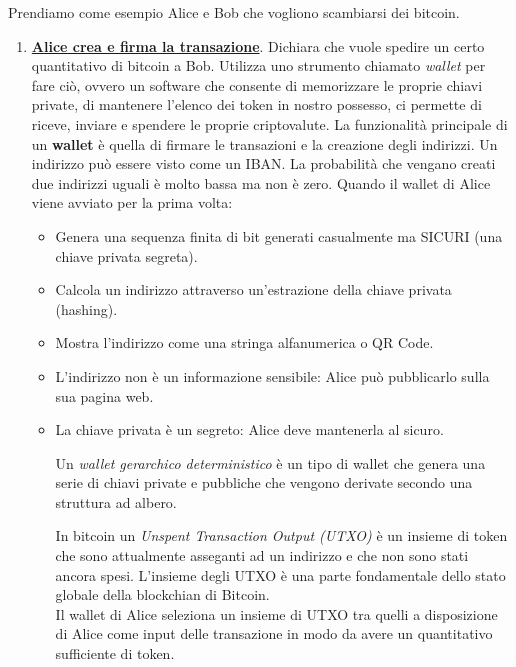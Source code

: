 \documentclass[a4paper]{article}
\begin{document}
Prendiamo come esempio Alice e Bob che vogliono scambiarsi dei bitcoin.
\begin{enumerate}
    \item \underline{\textbf{Alice crea e firma la transazione}}. Dichiara che vuole spedire un certo quantitativo di bitcoin a Bob. Utilizza uno strumento chiamato \textit{wallet} per fare ciò, ovvero un software che consente di memorizzare le proprie chiavi private, 
    di mantenere l'elenco dei token in nostro possesso, ci permette di riceve, inviare e spendere le proprie criptovalute. 
    La funzionalità principale di un \textbf{wallet} è quella di firmare le transazioni e la creazione degli indirizzi. Un indirizzo può essere visto come un IBAN. La probabilità che vengano creati due indirizzi uguali è molto bassa ma non è zero.
    Quando il wallet di Alice viene avviato per la prima volta:
    \begin{itemize}
        \item Genera una sequenza finita di bit generati casualmente ma SICURI (una chiave privata segreta).
        \item Calcola un indirizzo attraverso un'estrazione della chiave privata (hashing).
        \item Mostra l'indirizzo come una stringa alfanumerica o QR Code.
        \item L'indirizzo non è un informazione sensibile: Alice può pubblicarlo sulla sua pagina web.
        \item La chiave privata è un segreto: Alice deve mantenerla al sicuro.
        \begin{definition}
            Un \textit{wallet gerarchico deterministico} è un tipo di wallet che genera una serie di chiavi private e pubbliche che vengono derivate secondo una struttura ad albero.
        \end{definition}
        \begin{definition}
            In bitcoin un \textit{Unspent Transaction Output (UTXO)} è un insieme di token che sono attualmente asseganti ad un indirizzo e che non sono stati ancora spesi.
            L'insieme degli UTXO è una parte fondamentale dello stato globale della blockchian di Bitcoin.
            \\
            Il wallet di Alice seleziona un insieme di UTXO tra quelli a disposizione di Alice come input delle transazione in modo da avere un quantitativo sufficiente di token.
              

\end{definition}
\end{itemize}
\end{enumerate}
\end{document}
